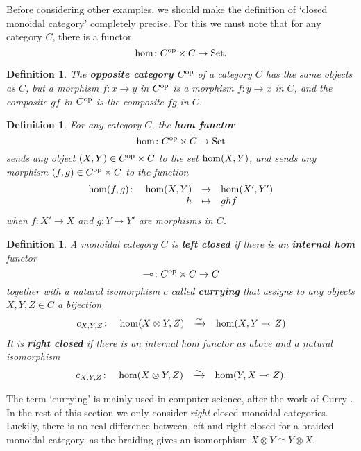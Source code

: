 \documentclass[12pt]{article}
\newtheorem{definition}[thm]{Definition}
\newcommand{\Set}{\mathrm{Set}}
\newcommand{\maps}{\colon}
\newcommand{\isoto}{\xrightarrow{\sim}}
\newcommand{\lhom}{\multimap}
\renewcommand{\hom}{{\rm hom}}
\newcommand{\tensor}{\otimes}
\newcommand{\op}{{\rm op}}
\begin{document}
Before considering other examples, we should make the definition
of `closed monoidal category' completely precise.  For this we must
note that for any category $C$, there is a functor
\[            \hom \maps C^{\op} \times C \to \Set  .\]

\begin{definition} The {\bf opposite category} $C^{\op}$ of a category $C$ 
has the same objects as $C$, but a morphism $f \maps x \to y$ in $C^{\op}$ is 
a morphism $f \maps y \to x$ in $C$, and the composite $gf$ in
$C^{\op}$ is the composite $fg$ in $C$.  \end{definition}

\begin{definition} 
\label{hom.functor}
For any category $C$, the {\bf hom functor}
\[       \hom \maps C^\op \times C \to \Set  \]
sends any object $(X,Y) \in C^\op \times C$ to the set $\hom(X,Y)$,
and sends any morphism $(f,g) \in C^\op \times C$ to the function
\[ 
\begin{array}{rrcl}
\hom(f,g) \maps & \hom(X,Y) & \to     & \hom(X',Y')\\
                & h         & \mapsto & ghf
\end{array}
\]
when $f\maps X' \to X$ and $g\maps Y \to Y'$ are morphisms in $C$.
\end{definition}

\begin{definition}
\label{closed.definition}
A monoidal category $C$ is {\bf left closed} if there is an
{\bf internal hom} functor
\[     \lhom \maps C^\op \times C \to C \]
together with a natural isomorphism $c$ called
{\bf currying} that assigns to any objects $X, Y, Z \in C$ 
a bijection
\[ \begin{array}{rrcl}
 c_{X,Y,Z} \maps & \hom(X\tensor Y, Z) & \isoto & \hom(X,Y \lhom Z)  
\end{array}
\]
It is {\bf right closed} if there is an internal hom functor as above
and a natural isomorphism
\[ \begin{array}{rrcl}
 c_{X,Y,Z} \maps & \hom(X\tensor Y, Z) & \isoto & \hom(Y,X \lhom Z) . 
\end{array}
\]
\end{definition}
\noindent
The term `currying' is mainly used in computer science, after the 
work of Curry \cite{Curry}.  In the rest of this section we only 
consider {\it right} closed monoidal categories.   Luckily, there 
is no real difference between left and right closed for a braided 
monoidal category, as the braiding gives an isomorphism $X \tensor 
Y \cong Y \tensor X$.  
\end{document}
